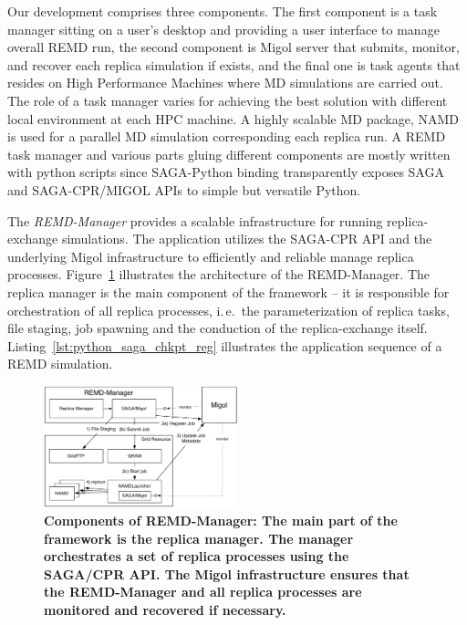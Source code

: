\documentclass[times, 10pt, twocolumn]{article}
\newcommand{\up}{\vspace*{-1em}}
\begin{document}

Our development comprises three components. The first component is a
task manager sitting on a user's desktop and providing a user
interface to manage overall REMD run, the second component is Migol
server that submits, monitor, and recover each replica simulation if
exists, and the final one is task agents that resides on High
Performance Machines where MD simulations are carried out.  The role
of a task manager varies for achieving the best solution with
different local environment at each HPC machine.  A highly scalable MD
package, NAMD~\cite{Phillips:2005gd} is used for a parallel MD
simulation corresponding each replica run.  A REMD task manager and
various parts gluing different components are mostly written with
python scripts since SAGA-Python binding transparently exposes SAGA
and SAGA-CPR/MIGOL APIs to simple but versatile Python.

The \emph{REMD-Manager} provides a scalable infrastructure for running
replica-exchange simulations.  The application utilizes the SAGA-CPR
API and the underlying Migol infrastructure to efficiently and
reliable manage replica
processes. Figure~\ref{fig:REMD-Manager-architecture} illustrates the
architecture of the REMD-Manager. The replica manager is the main
component of the framework -- it is responsible for orchestration of
all replica processes, i.\,e.\ the parameterization of replica tasks,
file staging, job spawning and the conduction of the replica-exchange
itself. Listing~\ref{lst:python_saga_chkpt_reg} illustrates the
application sequence of a REMD simulation.
                                  
\begin{figure}[h]
      \centering
          \includegraphics[width=0.5\textwidth]{REMDgManager-architecture.pdf}
          \up\up
          \caption{\small \bf Components of REMD-Manager: The main part of the
            framework is the replica manager. The manager orchestrates
            a set of replica processes using the SAGA/CPR API. The
            Migol infrastructure ensures that the REMD-Manager and all
            replica processes are monitored and recovered if
            necessary.}
            \up\up
      \label{fig:REMD-Manager-architecture}
\end{figure}
\end{document}
